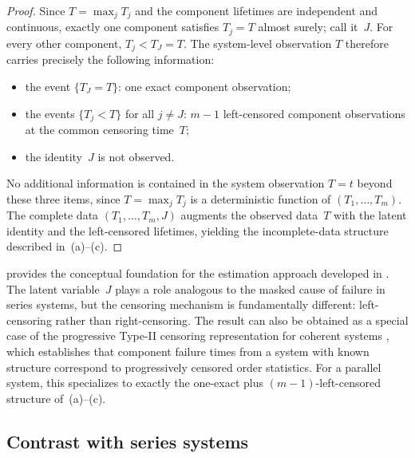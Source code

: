 \begin{proof}
Since $T = \max_j T_j$ and the component lifetimes are independent and
continuous, exactly one component satisfies $T_j = T$ almost surely; call
it~$J$.  For every other component, $T_j < T_J = T$.  The system-level
observation $T$ therefore carries precisely the following information:
\begin{itemize}
  \item the event $\{T_J = T\}$: one exact component observation;
  \item the events $\{T_j < T\}$ for all $j \neq J$: $m-1$ left-censored
    component observations at the common censoring time~$T$;
  \item the identity~$J$ is not observed.
\end{itemize}
No additional information is contained in the system observation $T = t$
beyond these three items, since $T = \max_j T_j$ is a deterministic function
of $(T_1, \ldots, T_m)$.  The complete data $(T_1, \ldots, T_m, J)$ augments
the observed data~$T$ with the latent identity and the left-censored lifetimes,
yielding the incomplete-data structure described in~(a)--(c).
\end{proof}

 provides the conceptual foundation for the
estimation approach developed in .
The latent variable~$J$ plays a role analogous to the masked cause of
failure in series systems, but the censoring mechanism is fundamentally
different: left-censoring rather than right-censoring.
The result can also be obtained as a special case of the progressive
Type-II censoring representation for coherent systems
\citep{CramerNavarro2015}, which establishes that component failure times
from a system with known structure correspond to progressively censored
order statistics.  For a parallel system, this specializes to exactly
the one-exact plus $(m-1)$-left-censored structure of~(a)--(c).

\subsection{Contrast with series systems}
\label{sec:series-contrast}


